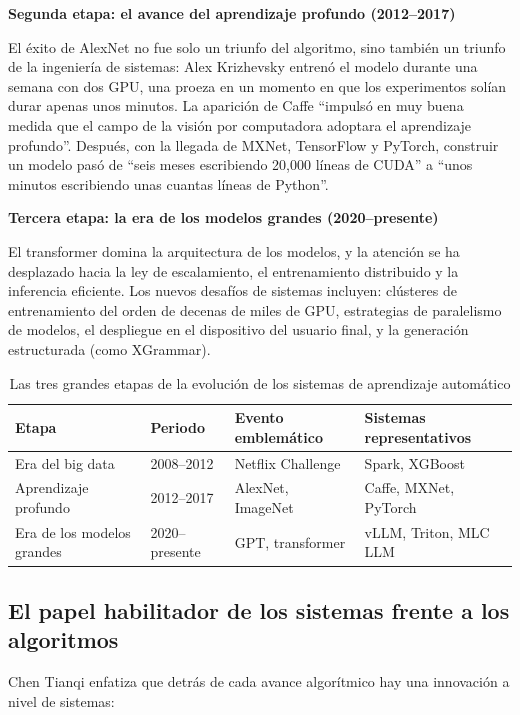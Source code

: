\documentclass[a4paper]{article}
\begin{document}
\textbf{Segunda etapa: el avance del aprendizaje profundo (2012--2017)}

El éxito de AlexNet no fue solo un triunfo del algoritmo, sino también un triunfo de la ingeniería de sistemas: Alex Krizhevsky entrenó el modelo durante una semana con dos GPU, una proeza en un momento en que los experimentos solían durar apenas unos minutos. La aparición de Caffe ``impulsó en muy buena medida que el campo de la visión por computadora adoptara el aprendizaje profundo''. Después, con la llegada de MXNet, TensorFlow y PyTorch, construir un modelo pasó de ``seis meses escribiendo 20,000 líneas de CUDA'' a ``unos minutos escribiendo unas cuantas líneas de Python''.

\textbf{Tercera etapa: la era de los modelos grandes (2020--presente)}

El transformer domina la arquitectura de los modelos, y la atención se ha desplazado hacia la ley de escalamiento, el entrenamiento distribuido y la inferencia eficiente. Los nuevos desafíos de sistemas incluyen: clústeres de entrenamiento del orden de decenas de miles de GPU, estrategias de paralelismo de modelos, el despliegue en el dispositivo del usuario final, y la generación estructurada (como XGrammar).

\begin{table}[H]
\centering
\begin{tabular}{p{2.5cm}p{3cm}p{3cm}p{4cm}}
\toprule
\textbf{Etapa} & \textbf{Periodo} & \textbf{Evento emblemático} & \textbf{Sistemas representativos} \\
\midrule
Era del big data & 2008--2012 & Netflix Challenge & Spark, XGBoost \\
Aprendizaje profundo & 2012--2017 & AlexNet, ImageNet & Caffe, MXNet, PyTorch \\
Era de los modelos grandes & 2020--presente & GPT, transformer & vLLM, Triton, MLC LLM \\
\bottomrule
\end{tabular}
\caption{Las tres grandes etapas de la evolución de los sistemas de aprendizaje automático}
\end{table}

\subsection{El papel habilitador de los sistemas frente a los algoritmos}

Chen Tianqi enfatiza que detrás de cada avance algorítmico hay una innovación a nivel de sistemas:
\end{document}
